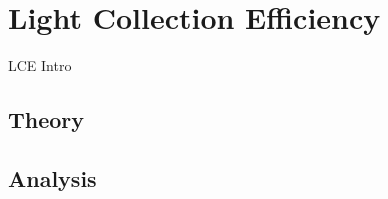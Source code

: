 
\section{Light Collection Efficiency}
\label{sec:LCE}


LCE Intro

\subsection{Theory}


\subsection{Analysis}


